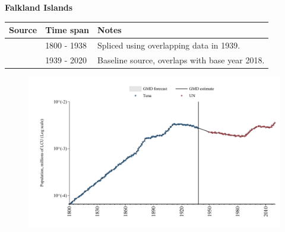 \documentclass[12pt,a4paper,landscape]{article}
\begin{document}
\begin{adjustbox}{max totalsize={\paperwidth}{\paperheight},center}
\begin{minipage}[t][\textheight][t]{\textwidth}
\vspace*{0.5cm}
{}
\begin{center}
{\Large\bfseries Falkland Islands}
\end{center}
\vspace{0.5cm}
\begin{table}[H]
\centering
\small
\begin{tabular}{|l|l|l|}
\hline
\textbf{Source} & \textbf{Time span} & \textbf{Notes} \\
\hline
\rowcolor{white}\cite{Tena}& 1800 - 1938 &Spliced using overlapping data in 1939.\\
\rowcolor{lightgray}\cite{UN}& 1939 - 2020 &Baseline source, overlaps with base year 2018.\\
\hline
\end{tabular}
\end{table}
\begin{figure}[H]
\centering
\includegraphics[width=\textwidth,height=0.6\textheight,keepaspectratio]{graphs/FLK_pop.pdf}
\end{figure}
\end{minipage}
\end{adjustbox}
\end{document}

